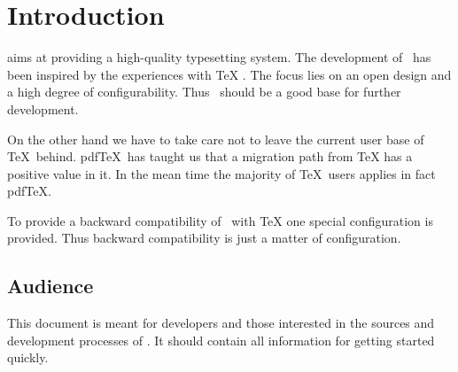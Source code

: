 \chapter{Introduction}

\ExTeX{} aims at providing a high-quality typesetting system. The
development of \ExTeX\ has been inspired by the experiences with
\TeX{} \cite{knuth:texbook}. The focus lies on an open
design and a high degree of configurability. Thus \ExTeX\ should be a
good base for further development.

On the other hand we have to take care not to leave the current user
base of \TeX\ behind. pdf\TeX\ has taught us that a migration path
from \TeX{} has a positive value in it. In the mean time
the majority of \TeX\ users applies in fact
pdf\TeX{}.

To provide a backward compatibility of \ExTeX\ with
\TeX{} one special configuration is provided. Thus
backward compatibility is just a matter of configuration.


\section{Audience}

This document is meant for developers and those interested in the
sources and development processes of \ExTeX. It should contain all
information for getting started quickly.


